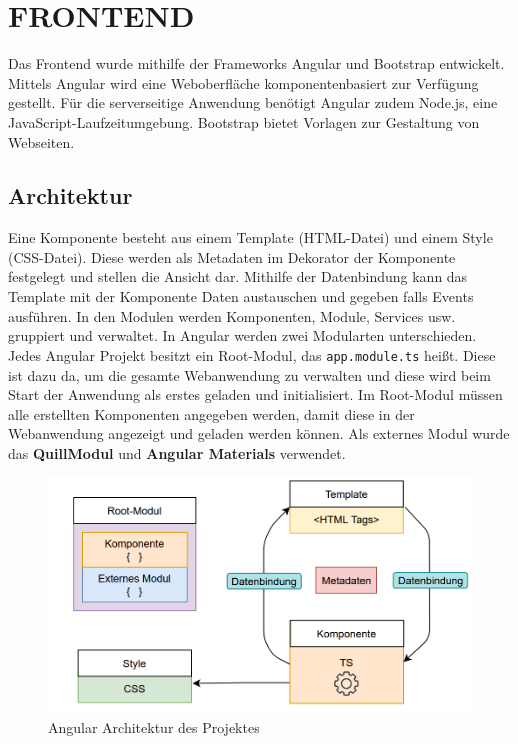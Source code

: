 \section{FRONTEND}\label{ch:frontend}

Das Frontend wurde mithilfe der Frameworks Angular und Bootstrap entwickelt. Mittels Angular wird eine Weboberfläche komponentenbasiert zur Verfügung gestellt. Für die serverseitige Anwendung benötigt Angular zudem Node.js, eine JavaScript-Laufzeitumgebung. Bootstrap bietet Vorlagen zur Gestaltung von Webseiten.

\subsection{Architektur}
Eine Komponente besteht aus einem Template (HTML-Datei) und einem Style (CSS-Datei). Diese werden als Metadaten im Dekorator der Komponente festgelegt und stellen die Ansicht dar. Mithilfe der Datenbindung kann das Template mit der Komponente Daten austauschen und gegeben falls Events ausführen. In den Modulen werden Komponenten, Module, Services usw. gruppiert und verwaltet. In Angular werden zwei Modularten unterschieden. Jedes Angular Projekt besitzt ein Root-Modul, das \texttt{app.module.ts} heißt. Diese ist dazu da, um die gesamte Webanwendung zu verwalten und diese wird beim Start der Anwendung als erstes geladen und initialisiert. Im Root-Modul müssen alle erstellten Komponenten angegeben werden, damit diese in der Webanwendung angezeigt und geladen werden können. Als externes Modul wurde das \textbf{QuillModul} und \textbf{Angular Materials} verwendet.

\begin{figure}[thpb]
      \centering
      \includegraphics[scale=0.55]{../abbildungen/angular_architektur.png}
      \caption{Angular Architektur des Projektes}
      \label{fig:frontend}
 \end{figure}

